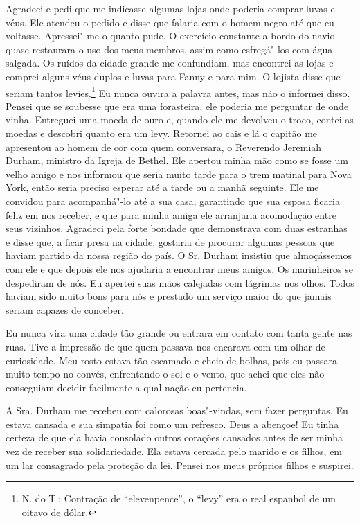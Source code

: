 Agradeci e pedi que me indicasse algumas lojas onde poderia comprar
luvas e véus. Ele atendeu o pedido e disse que falaria com o homem negro
até que eu voltasse. Apressei"-me o quanto pude. O exercício constante a
bordo do navio quase restaurara o uso dos meus membros, assim como
esfregá"-los com água salgada. Os ruídos da cidade grande me confundiam,
mas encontrei as lojas e comprei alguns véus duplos e luvas para Fanny e
para mim. O lojista disse que seriam tantos levies.\footnote{N. do T.:
  Contração de ``elevenpence'', o ``levy'' era o real espanhol de um
  oitavo de dólar.} Eu nunca ouvira a palavra antes, mas não o informei
disso. Pensei que se soubesse que era uma forasteira, ele poderia me
perguntar de onde vinha. Entreguei uma moeda de ouro e, quando ele me
devolveu o troco, contei as moedas e descobri quanto era um levy.
Retornei ao cais e lá o capitão me apresentou ao homem de cor com quem
conversara, o Reverendo Jeremiah Durham, ministro da Igreja de Bethel.
Ele apertou minha mão como se fosse um velho amigo e nos informou que
seria muito tarde para o trem matinal para Nova York, então seria
preciso esperar até a tarde ou a manhã seguinte. Ele me convidou para
acompanhá"-lo até a sua casa, garantindo que sua esposa ficaria feliz em
nos receber, e que para minha amiga ele arranjaria acomodação entre seus
vizinhos. Agradeci pela forte bondade que demonstrava com duas estranhas
e disse que, a ficar presa na cidade, gostaria de procurar algumas
pessoas que haviam partido da nossa região do país. O Sr. Durham
insistiu que almoçássemos com ele e que depois ele nos ajudaria a
encontrar meus amigos. Os marinheiros se despediram de nós. Eu apertei
suas mãos calejadas com lágrimas nos olhos. Todos haviam sido muito bons
para nós e prestado um serviço maior do que jamais seriam capazes de
conceber.

Eu nunca vira uma cidade tão grande ou
entrara em contato com tanta gente nas ruas. Tive a impressão de que
quem passava nos encarava com um olhar de curiosidade. Meu rosto estava
tão escamado e cheio de bolhas, pois eu passara muito tempo no convés,
enfrentando o sol e o vento, que achei que eles não conseguiam decidir
facilmente a qual nação eu pertencia.

A Sra. Durham me recebeu com calorosas
boas"-vindas, sem fazer perguntas. Eu estava cansada e sua simpatia foi
como um refresco. Deus a abençoe! Eu tinha certeza de que ela havia
consolado outros corações cansados antes de ser minha vez de receber sua
solidariedade. Ela estava cercada pelo marido e os filhos, em um lar
consagrado pela proteção da lei. Pensei nos meus próprios filhos e
suspirei.

